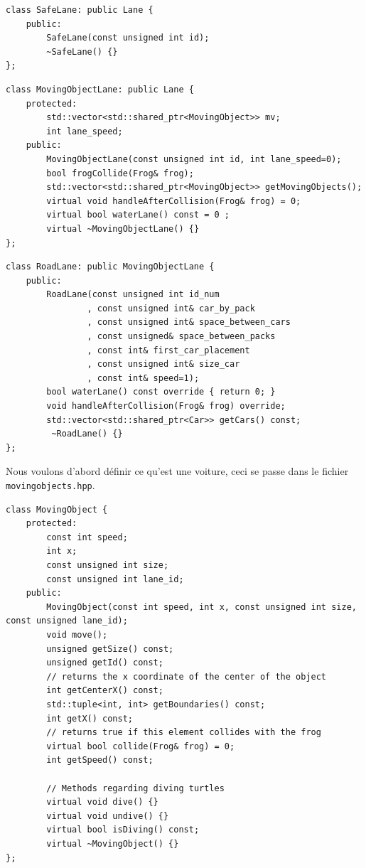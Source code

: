 \documentclass[a4paper, 12pt]{article}
\begin{document}
\begin{lstlisting}
class SafeLane: public Lane {
    public:
        SafeLane(const unsigned int id);
        ~SafeLane() {}
};
\end{lstlisting}

\begin{lstlisting}
class MovingObjectLane: public Lane {
    protected:
        std::vector<std::shared_ptr<MovingObject>> mv;
        int lane_speed;
    public:
        MovingObjectLane(const unsigned int id, int lane_speed=0);
        bool frogCollide(Frog& frog);
        std::vector<std::shared_ptr<MovingObject>> getMovingObjects();
        virtual void handleAfterCollision(Frog& frog) = 0;
        virtual bool waterLane() const = 0 ;
        virtual ~MovingObjectLane() {}
};
\end{lstlisting}

\pagebreak

\begin{lstlisting}
class RoadLane: public MovingObjectLane {
    public:
        RoadLane(const unsigned int id_num
                , const unsigned int& car_by_pack
                , const unsigned int& space_between_cars
                , const unsigned& space_between_packs
                , const int& first_car_placement
                , const unsigned int& size_car
                , const int& speed=1);
        bool waterLane() const override { return 0; }
        void handleAfterCollision(Frog& frog) override;
        std::vector<std::shared_ptr<Car>> getCars() const;
         ~RoadLane() {}
};
\end{lstlisting}

Nous voulons d'abord définir ce qu'est une voiture, 
ceci se passe dans le fichier \texttt{movingobjects.hpp}. 

\begin{lstlisting}
class MovingObject {
    protected:
        const int speed;
        int x;
        const unsigned int size;
        const unsigned int lane_id;
    public:
        MovingObject(const int speed, int x, const unsigned int size, const unsigned lane_id);
        void move();
        unsigned getSize() const;
        unsigned getId() const;
        // returns the x coordinate of the center of the object
        int getCenterX() const;
        std::tuple<int, int> getBoundaries() const;
        int getX() const;
        // returns true if this element collides with the frog
        virtual bool collide(Frog& frog) = 0;
        int getSpeed() const;
      
        // Methods regarding diving turtles
        virtual void dive() {}
        virtual void undive() {}
        virtual bool isDiving() const;
        virtual ~MovingObject() {}
};
\end{lstlisting}
\end{document}
